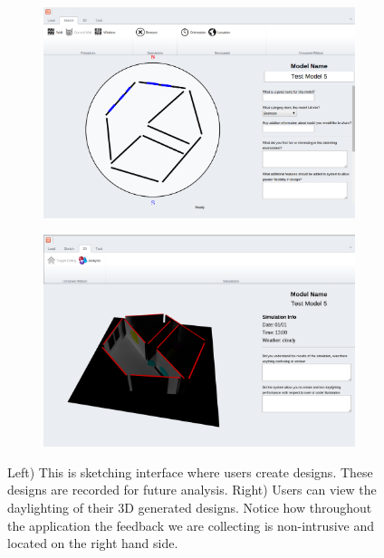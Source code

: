 \documentclass[12pt]{article}
\begin{document}
\begin{figure}[h]
  \begin{subfigure}{.5\textwidth}
    \centering
    \includegraphics[scale=0.2]{ss_sketch}
  \end{subfigure}%
  \begin{subfigure}{.5\textwidth}
    \centering
    \includegraphics[scale=0.2]{ss_render}
  \end{subfigure}
\caption{Left) This is sketching interface where users create designs. These designs are recorded for future analysis. Right) Users can view the daylighting of their 3D generated designs. Notice how throughout the application the feedback we are collecting is non-intrusive and located on the right hand side. }
\end{figure}
\end{document}
